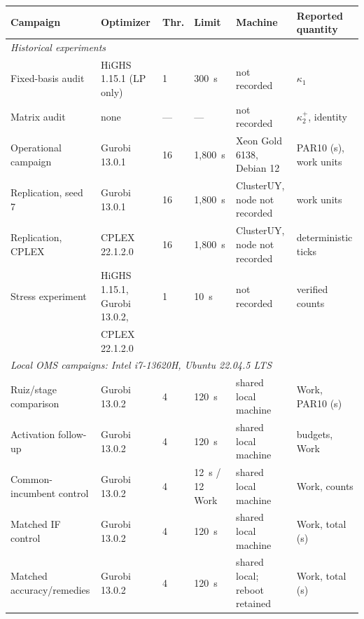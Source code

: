 \begin{tabular}{llllll}
\toprule
Campaign & Optimizer & Thr. & Limit & Machine & Reported quantity \\
\midrule
\multicolumn{6}{l}{\emph{Historical experiments}}\\
Fixed-basis audit    & HiGHS 1.15.1 (LP only)       & 1  & 300~s   & not recorded              & $\kappa_1$ \\
Matrix audit         & none                         & --- & ---    & not recorded              & $\kappa_2^{+}$, identity \\
Operational campaign & Gurobi 13.0.1                & 16 & 1,800~s & Xeon Gold 6138, Debian 12 & PAR10 (s), work units \\
Replication, seed 7  & Gurobi 13.0.1                & 16 & 1,800~s & ClusterUY, node not recorded & work units \\
Replication, CPLEX   & CPLEX 22.1.2.0               & 16 & 1,800~s & ClusterUY, node not recorded & deterministic ticks \\
Stress experiment    & HiGHS 1.15.1, Gurobi 13.0.2, & 1  & 10~s    & not recorded              & verified counts \\
                     & CPLEX 22.1.2.0               &    &         &                           & \\
\midrule
\multicolumn{6}{l}{\emph{Local OMS campaigns: Intel i7-13620H, Ubuntu 22.04.5 LTS}}\\
Ruiz/stage comparison & Gurobi 13.0.2 & 4 & 120~s & shared local machine & Work, PAR10 (s)\\
Activation follow-up & Gurobi 13.0.2 & 4 & 120~s & shared local machine & budgets, Work\\
Common-incumbent control & Gurobi 13.0.2 & 4 & 12~s / 12 Work & shared local machine & Work, counts\\
Matched IF control & Gurobi 13.0.2 & 4 & 120~s & shared local machine & Work, total (s)\\
Matched accuracy/remedies & Gurobi 13.0.2 & 4 & 120~s & shared local; reboot retained & Work, total (s)\\
\bottomrule
\end{tabular}
